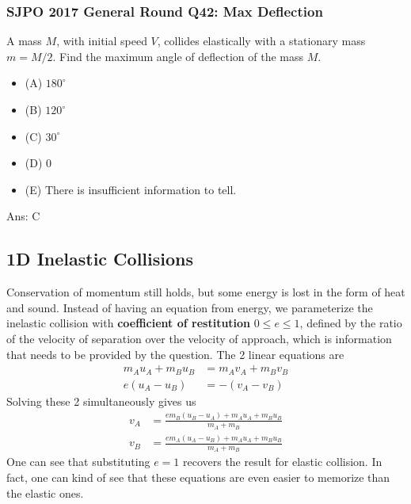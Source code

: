 \documentclass{article}
\begin{document}
\subsubsection{SJPO 2017 General Round Q42: Max Deflection}
A mass $M$, with initial speed $V$, collides elastically with a stationary mass $m=M / 2$. Find the maximum angle of deflection of the mass $M$.
\begin{itemize}
\item[] (A) $180^{\circ}$
\item[] (B) $120^{\circ}$
\item[] (C) $30^{\circ}$
\item[] (D) 0
\item[] (E) There is insufficient information to tell.
\end{itemize}
Ans: \ifpaper C \fi
\subsection{1D Inelastic Collisions}
Conservation of momentum still holds, but some energy is lost in the form of heat and sound. Instead of having an equation from energy, we parameterize the inelastic collision with \textbf{coefficient of restitution} $0\leq e \leq 1$, defined by the ratio of the velocity of separation over the velocity of approach, which is information that needs to be provided by the question. The 2 linear equations are 
\begin{align}
    m_A u_A + m_B u_B &= m_A v_A + m_B v_B \\
    e (u_A - u_B) &= -(v_A - v_B)
\end{align}
Solving these 2 simultaneously gives us
\begin{align}
    v_A &= \frac{e m_B (u_B - u_A) + m_A u_A + m_B u_B}{m_A + m_B} \\
    v_B &= \frac{e m_A (u_A - u_B) + m_A u_A + m_B u_B}{m_A + m_B}
\end{align}
One can see that substituting $e=1$ recovers the result for elastic collision. In fact, one can kind of see that these equations are even easier to memorize than the elastic ones. 
\end{document}
